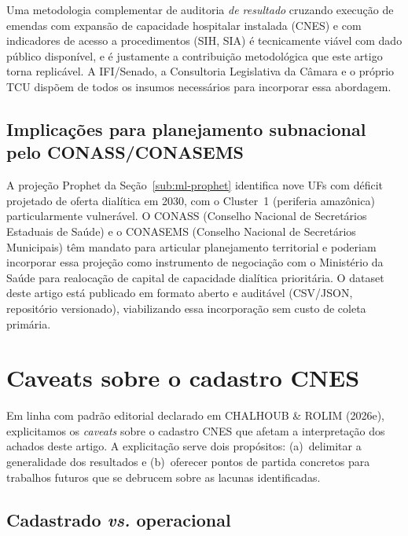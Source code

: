 \documentclass[12pt,a4paper,oneside]{article}
\begin{document}
Uma metodologia complementar de auditoria \textit{de resultado}
\textemdash{} cruzando execução de emendas com expansão de
capacidade hospitalar instalada (CNES) e com indicadores de
acesso a procedimentos (SIH, SIA) \textemdash{} é tecnicamente
viável com dado público disponível, e é justamente a contribuição
metodológica que este artigo torna replicável. A IFI/Senado, a
Consultoria Legislativa da Câmara e o próprio TCU dispõem de
todos os insumos necessários para incorporar essa abordagem.

\subsection{Implicações para planejamento subnacional pelo
CONASS/CONASEMS}

A projeção Prophet da Seção~\ref{sub:ml-prophet} identifica
nove UFs com déficit projetado de oferta dialítica em 2030, com
o Cluster~1 (periferia amazônica) particularmente vulnerável.
O CONASS (Conselho Nacional de Secretários Estaduais de Saúde) e
o CONASEMS (Conselho Nacional de Secretários Municipais) têm
mandato para articular planejamento territorial e poderiam
incorporar essa projeção como instrumento de negociação com o
Ministério da Saúde para realocação de capital de capacidade
dialítica prioritária. O dataset deste artigo está publicado em
formato aberto e auditável (CSV/JSON, repositório versionado),
viabilizando essa incorporação sem custo de coleta primária.

\section{Caveats sobre o cadastro CNES}\label{sec:caveats}

Em linha com padrão editorial declarado em CHALHOUB \& ROLIM
(2026e), explicitamos os \textit{caveats} sobre o cadastro CNES
que afetam a interpretação dos achados deste artigo. A
explicitação serve dois propósitos: (a)~delimitar a generalidade
dos resultados e (b)~oferecer pontos de partida concretos para
trabalhos futuros que se debrucem sobre as lacunas identificadas.

\subsection{Cadastrado \textit{vs.} operacional}\label{sub:caveat-operacional}
\end{document}

